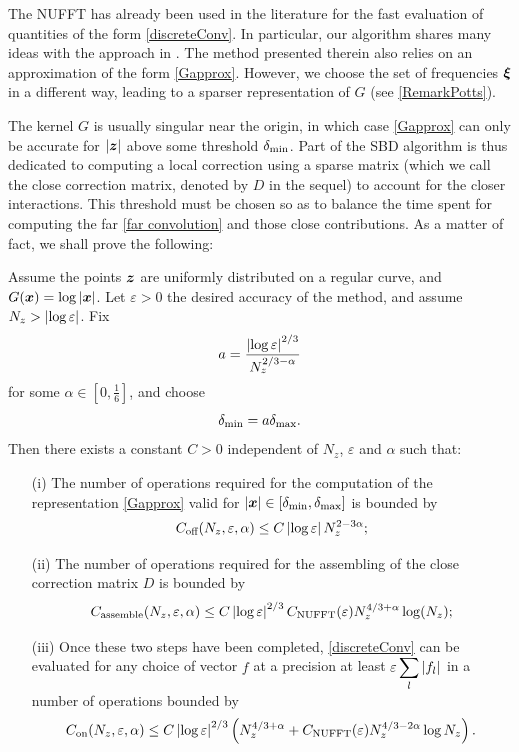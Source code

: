 \documentclass{article}
\begin{document}
The NUFFT has already been used in the literature for the fast evaluation of quantities of the form \eqref{discreteConv}. In particular, our algorithm shares many ideas with the approach in \cite{potts2004fast}. The method presented therein also relies on an approximation of the form \eqref{Gapprox}. However, we choose the set of frequencies $\boldsymbol{\xi}$ in a different way, leading to a sparser representation of $G$ (see \autoref{RemarkPotts}). 

The kernel $G$ is usually singular near the origin, in which case \eqref{Gapprox} can only be accurate for $|\boldsymbol{z}|$ above some threshold $\delta_{\min}$. Part of the SBD algorithm is thus dedicated to computing a local correction using a sparse matrix (which we call the close correction matrix, denoted by $D$ in the sequel) to account for the closer interactions. This threshold must be chosen so as to balance the time spent for computing the far \eqref{far convolution} and those close contributions. As a matter of fact, we shall prove the following:

\begin{Theorem} Assume the points $\boldsymbol{z}$ are uniformly distributed on a regular curve, and $G(\boldsymbol{x}) = \log \left\lvert \boldsymbol{x} \right\rvert$. Let $\varepsilon > 0$ the desired accuracy of the method, and assume $N_z > \left\lvert \log{\varepsilon} \right\rvert$. Fix 
	\[a =\dfrac{\left\lvert \log\varepsilon \right\rvert^{2/3}}{N_z^{2/3 - \alpha}}\]
	for some $\alpha \in \left[0,\frac{1}{6}\right]$, and choose 
	\[\delta_{\min} = a \delta_{\max}.\] 
	Then there exists a constant $C>0$ independent of $N_z$, $\varepsilon$ and $\alpha$ such that:
	\label{The:GlobalComplexity}
	\begin{itemize}
		\item[(i)] The number of operations required for the computation of the representation \eqref{Gapprox} valid for $\left\lvert \boldsymbol{x} \right\rvert \in [\delta_{\min},\delta_{\max}]$  is bounded by 
		      \[ C_{\textup{off}}(N_z,\varepsilon,\alpha) \leq C \left\lvert \log \varepsilon \right\rvert N_z^{2 - 3\alpha};\]
		\item[(ii)] The number of operations required for the assembling of the close correction matrix $D$ is bounded by
		      \[C_{\textup{assemble}}(N_z,\varepsilon,\alpha)\leq C \left\lvert \log\varepsilon \right\rvert^{2/3}  C_{\textup{NUFFT}}(\varepsilon) N_z^{4/3 + \alpha}\log(N_z);\]
		\item[(iii)] Once these two steps have been completed, \eqref{discreteConv} can be evaluated for any choice of vector $f$ at a precision at least $\varepsilon \displaystyle\sum_l \left\lvert f_l \right\rvert$ in a number of operations bounded by
		      \[C_{\textup{on}}(N_z,\varepsilon,\alpha) \leq C \left\lvert \log\varepsilon \right\rvert^{2/3} \left(  N_z ^{4/3 + \alpha} + C_{\textup{NUFFT}}(\varepsilon)N_z^{4/3 - 2\alpha}\log N_z \right).\] 
	\end{itemize} 
\end{Theorem}
\end{document}
